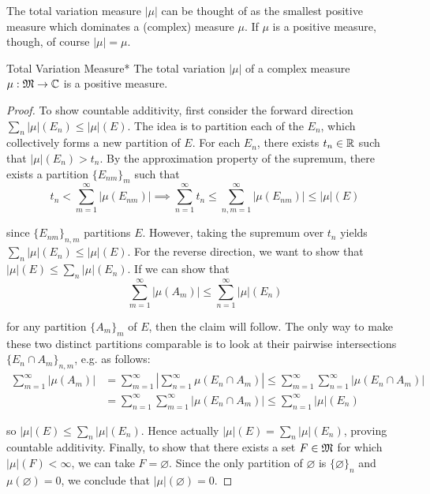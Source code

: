 The total variation measure \(|\mu|\) can be thought of as the smallest positive measure which dominates a (complex) measure \(\mu\). If \(\mu\) is a positive measure, though, of course \(|\mu| = \mu\). 
\stdvspace

\begin{theorem}{Total Variation Measure}*
    The total variation \(|\mu|\) of a complex measure \(\mu : \mathfrak{M} \to \mathbb{C}\) is a positive measure. 
\end{theorem}

\begin{proof}
    To show countable additivity, first consider the forward direction \(\sum_n |\mu|(E_n) \leq |\mu|(E)\). The idea is to partition each of the \(E_n\), which collectively forms a new partition of \(E\). For each \(E_n\), there exists \(t_n \in \mathbb{R}\) such that \(|\mu|(E_n) > t_n\). By the approximation property of the supremum, there exists a partition \(\{E_{nm}\}_m\) such that 
    \[
        t_n < \sum_{m=1}^\infty |\mu(E_{nm})|
        \implies
        \sum_{n=1}^\infty t_n \leq \sum_{n,m=1}^\infty |\mu(E_{nm})|
        \leq |\mu|(E) 
    \]

    since \(\{E_{nm}\}_{n,m}\) partitions \(E\). However, taking the supremum over \(t_n\) yields \(\sum_n |\mu|(E_n) \leq |\mu|(E)\). For the reverse direction, we want to show that \(|\mu|(E) \leq \sum_n |\mu|(E_n)\). If we can show that
    \[
        \sum_{m=1}^\infty |\mu(A_m)| \leq \sum_{n=1}^\infty |\mu|(E_n)
    \]

    for any partition \(\{A_m\}_m\) of \(E\), then the claim will follow. The only way to make these two distinct partitions comparable is to look at their pairwise intersections \(\{E_n \cap A_m\}_{n,m}\), e.g. as follows: 
    \begin{align*}
        \sum_{m=1}^\infty |\mu(A_m)|
        &= \sum_{m=1}^\infty \left| \sum_{n=1}^\infty \mu(E_n \cap A_m) \right| 
        \leq \sum_{m=1}^\infty \sum_{n=1}^\infty |\mu(E_n \cap A_m)| \\
        &= \sum_{n=1}^\infty \sum_{m=1}^\infty |\mu(E_n \cap A_m)|
        \leq \sum_{n=1}^\infty |\mu|(E_n)
    \end{align*}

    so \(|\mu|(E) \leq \sum_n |\mu|(E_n)\). Hence actually \(|\mu|(E) = \sum_n |\mu|(E_n)\), proving countable additivity. Finally, to show that there exists a set \(F \in \mathfrak{M}\) for which \(|\mu|(F) < \infty\), we can take \(F = \varnothing\). Since the only partition of \(\varnothing\) is \(\{\varnothing\}_n\) and \(\mu(\varnothing) = 0\), we conclude that \(|\mu|(\varnothing) = 0\). 
\end{proof}


